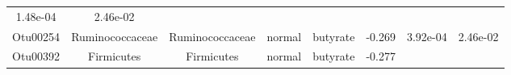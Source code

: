 \documentclass[11pt,]{article}
\begin{document}
\begin{longtable}[]{@{}cccccccc@{}}
\begin{minipage}[t]{0.08\columnwidth}
1.48e-04\strut
\end{minipage} & \begin{minipage}[t]{0.08\columnwidth}\centering\strut
2.46e-02\strut
\end{minipage}\tabularnewline
\begin{minipage}[t]{0.08\columnwidth}\centering\strut
Otu00254\strut
\end{minipage} & \begin{minipage}[t]{0.15\columnwidth}\centering\strut
Ruminococcaceae\strut
\end{minipage} & \begin{minipage}[t]{0.15\columnwidth}\centering\strut
Ruminococcaceae\strut
\end{minipage} & \begin{minipage}[t]{0.08\columnwidth}\centering\strut
normal\strut
\end{minipage} & \begin{minipage}[t]{0.09\columnwidth}\centering\strut
butyrate\strut
\end{minipage} & \begin{minipage}[t]{0.07\columnwidth}\centering\strut
-0.269\strut
\end{minipage} & \begin{minipage}[t]{0.08\columnwidth}\centering\strut
3.92e-04\strut
\end{minipage} & \begin{minipage}[t]{0.08\columnwidth}\centering\strut
2.46e-02\strut
\end{minipage}\tabularnewline
\begin{minipage}[t]{0.08\columnwidth}\centering\strut
Otu00392\strut
\end{minipage} & \begin{minipage}[t]{0.15\columnwidth}\centering\strut
Firmicutes\strut
\end{minipage} & \begin{minipage}[t]{0.15\columnwidth}\centering\strut
Firmicutes\strut
\end{minipage} & \begin{minipage}[t]{0.08\columnwidth}\centering\strut
normal\strut
\end{minipage} & \begin{minipage}[t]{0.09\columnwidth}\centering\strut
butyrate\strut
\end{minipage} & \begin{minipage}[t]{0.07\columnwidth}\centering\strut
-0.277\strut
\end{minipage} & \begin{minipage}[t]{0.08\columnwidth}\centering\strut

\end{minipage}
\end{longtable}
\end{document}
